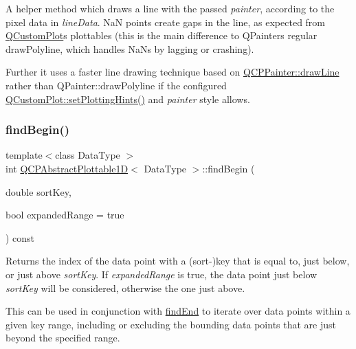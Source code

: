 A helper method which draws a line with the passed {\itshape painter}, according to the pixel data in {\itshape line\+Data}. NaN points create gaps in the line, as expected from \hyperlink{class_q_custom_plot}{Q\+Custom\+Plot}\textquotesingle{}s plottables (this is the main difference to Q\+Painter\textquotesingle{}s regular draw\+Polyline, which handles Na\+Ns by lagging or crashing).

Further it uses a faster line drawing technique based on \hyperlink{class_q_c_p_painter_a0b4b1b9bd495e182c731774dc800e6e0}{Q\+C\+P\+Painter\+::draw\+Line} rather than {\ttfamily Q\+Painter\+::draw\+Polyline} if the configured \hyperlink{class_q_custom_plot_a94a33cbdadbbac5934843508bcfc210d}{Q\+Custom\+Plot\+::set\+Plotting\+Hints()} and {\itshape painter} style allows. \mbox{\label{class_q_c_p_abstract_plottable1_d_ae6ead74a0d6a17954e1857f361b9ccf2}} 
\subsubsection{\texorpdfstring{find\+Begin()}{findBegin()}\hspace{0.1cm}{\footnotesize\ttfamily [1/2]}}
{\footnotesize\ttfamily template$<$class Data\+Type $>$ \\
int \hyperlink{class_q_c_p_abstract_plottable1_d}{Q\+C\+P\+Abstract\+Plottable1D}$<$ Data\+Type $>$\+::find\+Begin (\begin{DoxyParamCaption}\item[{double}]{sort\+Key,  }\item[{bool}]{expanded\+Range = {\ttfamily true} }\end{DoxyParamCaption}) const\hspace{0.3cm}{\ttfamily [virtual]}}





Returns the index of the data point with a (sort-\/)key that is equal to, just below, or just above {\itshape sort\+Key}. If {\itshape expanded\+Range} is true, the data point just below {\itshape sort\+Key} will be considered, otherwise the one just above.

This can be used in conjunction with \hyperlink{class_q_c_p_abstract_plottable1_d_ad913df7f02add35150779dce3913aeae}{find\+End} to iterate over data points within a given key range, including or excluding the bounding data points that are just beyond the specified range.

